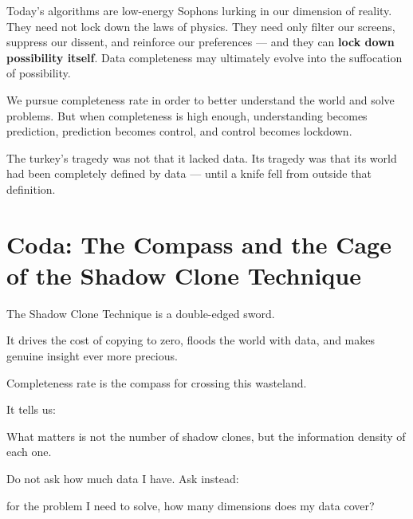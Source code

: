\vspace{1em}

Today's algorithms are low-energy Sophons lurking in our dimension of reality.
They need not lock down the laws of physics. They need only filter our screens, suppress our dissent, and reinforce our preferences --- and they can \textbf{lock down possibility itself}.
Data completeness may ultimately evolve into the suffocation of possibility.


\vspace{1em}

We pursue completeness rate in order to better understand the world and solve problems.
But when completeness is high enough, understanding becomes prediction, prediction becomes control, and control becomes lockdown.

\vspace{1em}

The turkey's tragedy was not that it lacked data. Its tragedy was that its world had been completely defined by data --- until a knife fell from outside that definition.


\newpage

\section{Coda: The Compass and the Cage of the Shadow Clone Technique}

The Shadow Clone Technique is a double-edged sword.

It drives the cost of copying to zero, floods the world with data, and makes genuine insight ever more precious.

Completeness rate is the compass for crossing this wasteland.

\vspace{1em}

It tells us:

What matters is not the number of shadow clones, but the information density of each one.

Do not ask how much data I have. Ask instead:

for the problem I need to solve, how many dimensions does my data cover?

